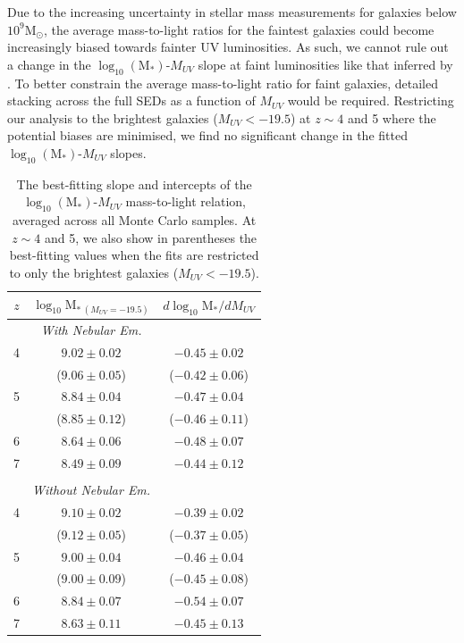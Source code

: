 Due to the increasing uncertainty in stellar mass measurements for galaxies below $10^{9} \text{M}_{\odot}$, the average mass-to-light ratios for the faintest galaxies could become increasingly biased towards fainter UV luminosities. As such, we cannot rule out a change in the $\log_{10} (\text{M}_{*})$-$M_{UV}$ slope at faint luminosities like that inferred by \citet{2012ApJ...752...66L}. To better constrain the average mass-to-light ratio for faint galaxies, detailed stacking across the full SEDs as a function of $M_{UV}$ would be required. Restricting our analysis to the brightest galaxies ($M_{UV} < -19.5$) at $z\sim4$ and 5 where the potential biases are minimised, we find no significant change in the fitted $\log_{10} (\text{M}_{*})$-$M_{UV}$ slopes.

\begin{table}
\caption[The best-fitting slope and intercepts of the $\log_{10} (\text{M}_{*})$-$M_{UV}$ mass-to-light relation, averaged across all Monte Carlo samples.]{The best-fitting slope and intercepts of the $\log_{10} (\text{M}_{*})$-$M_{UV}$ mass-to-light relation, averaged across all Monte Carlo samples. At $z\sim 4$ and 5, we also show in parentheses the best-fitting values when the fits are restricted to only the brightest galaxies ($M_{UV} < -19.5$).}
\centering
\begin{tabular}{c c c}
\hline
$z$ & $\log_{10}\text{M}_{*~(M_{UV}=-19.5)}$ & $d\log_{10}\text{M}_{*}/dM_{UV}$ \\ 
\hline
 & \emph{With Nebular Em.} & \\
4 & $9.02 \pm 0.02$ & $-0.45\pm 0.02$ \\
  & ($9.06 \pm 0.05$) &  ($-0.42 \pm 0.06$) \\
5 & $8.84 \pm 0.04$ & $-0.47\pm 0.04$ \\
  & ($8.85 \pm 0.12$) &  ($-0.46 \pm 0.11$) \\
6 & $8.64 \pm 0.06$ & $-0.48\pm 0.07$ \\
7 & $8.49 \pm 0.09$ & $-0.44\pm 0.12$ \\
 & & \\
 & \emph{Without Nebular Em.} & \\
4 & $9.10 \pm 0.02$ & $-0.39\pm 0.02$ \\
  & ($9.12 \pm 0.05$) &  ($-0.37 \pm 0.05$) \\
5 & $9.00 \pm 0.04$ & $-0.46\pm 0.04$ \\
  & ($9.00 \pm 0.09$) &  ($-0.45 \pm 0.08$) \\
6 & $8.84 \pm 0.07$ & $-0.54\pm 0.07$ \\
7 & $8.63 \pm 0.11$ & $-0.45\pm 0.13$ \\ 

\hline
\end{tabular}
\label{tab:ML}
\end{table}

